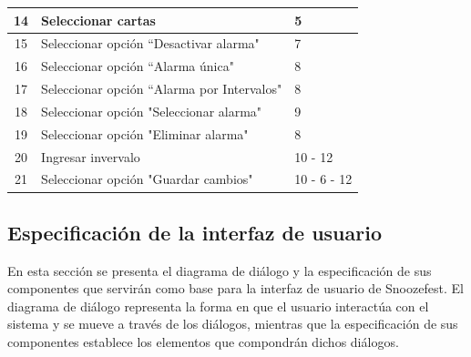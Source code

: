 \begin{table}[H]
\begin{tabular}{| c | l | l |}
        \hline
        14 & Seleccionar cartas & 5 \\
        \hline
        15 & Seleccionar opción ``Desactivar alarma" & 7 \\
        \hline
        16 & Seleccionar opción ``Alarma única" & 8 \\
        \hline
        17 & Seleccionar opción ``Alarma por Intervalos" & 8 \\
        \hline
        18 & Seleccionar opción "Seleccionar alarma" & 9 \\
        \hline
        19 & Seleccionar opción "Eliminar alarma" & 8 \\
        \hline
        20 & Ingresar invervalo & 10 - 12 \\
        \hline
        21 & Seleccionar opción "Guardar cambios" & 10 - 6 - 12 \\
        \hline
    \end{tabular}    
    
    \label{table:2}
\end{table}
\newpage
\subsection{Especificación de la interfaz de usuario}
En esta sección se presenta el diagrama de diálogo y la especificación de sus componentes que servirán como base para la interfaz de usuario de Snoozefest. El diagrama de diálogo representa la forma en que el usuario interactúa con el sistema y se mueve a través de los diálogos, mientras que la especificación de sus componentes establece los elementos que compondrán dichos diálogos.

